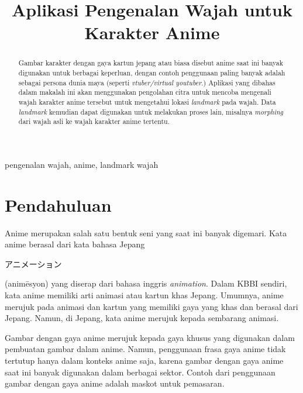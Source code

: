 \documentclass[conference, a4paper]{IEEEtran}
\begin{document}
\title{Aplikasi Pengenalan Wajah untuk Karakter Anime}

\author{
  }

\maketitle

\begin{abstract}
  Gambar karakter dengan gaya kartun jepang atau biasa disebut anime saat ini banyak digunakan untuk berbagai keperluan, dengan contoh penggunaan paling banyak adalah sebagai persona dunia maya (seperti \textit{vtuber/virtual youtuber}.) Aplikasi yang dibahas dalam makalah ini akan menggunakan pengolahan citra untuk mencoba mengenali wajah karakter anime tersebut untuk mengetahui lokasi \textit{landmark} pada wajah. Data \textit{landmark} kemudian dapat digunakan untuk melakukan proses lain, misalnya \textit{morphing} dari wajah asli ke wajah karakter anime tertentu.
\end{abstract}

\begin{IEEEkeywords}
  pengenalan wajah, anime, landmark wajah
\end{IEEEkeywords}

\section{Pendahuluan}
Anime merupakan salah satu bentuk seni yang saat ini banyak digemari. Kata anime berasal dari kata bahasa Jepang \begin{CJK}{UTF8}{ipxm}アニメーション\end{CJK} (anim\={e}syon) yang diserap dari bahasa inggris \textit{animation}. Dalam KBBI sendiri, kata anime memiliki arti animasi atau kartun khas Jepang. Umumnya, anime merujuk pada animasi dan kartun yang memiliki gaya yang khas dan berasal dari Jepang. Namun, di Jepang, kata anime merujuk kepada sembarang animasi.

Gambar dengan gaya anime merujuk kepada gaya khusus yang digunakan dalam pembuatan gambar dalam anime. Namun, penggunaan frasa gaya anime tidak tertutup hanya dalam konteks anime saja, karena gambar dengan gaya anime saat ini banyak digunakan dalam berbagai sektor. Contoh dari penggunaan gambar dengan gaya anime adalah maskot untuk pemasaran.
\end{document}
